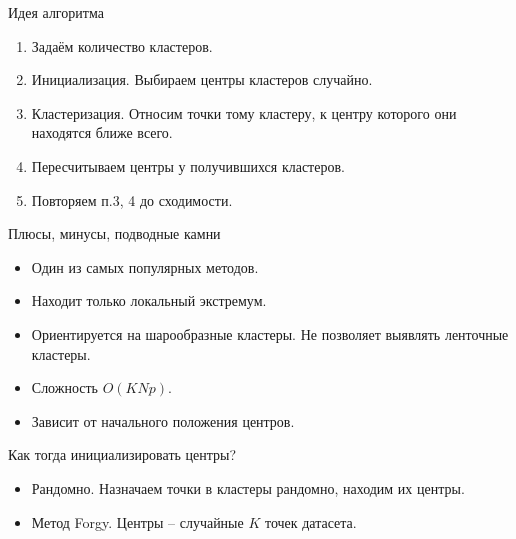 \documentclass[9pt]{beamer}
\begin{document}
\begin{frame}{Идея алгоритма}
    \begin{enumerate}
        \item Задаём количество кластеров.
        \item Инициализация. Выбираем центры кластеров случайно.
        \item Кластеризация. Относим точки тому кластеру, к центру которого они находятся ближе всего.
        \item Пересчитываем центры у получившихся кластеров.
        \item Повторяем п.3, 4 до сходимости.
    \end{enumerate}
\end{frame}


\begin{frame}{Плюсы, минусы, подводные камни}
\begin{itemize}
    \item  Один из самых популярных методов.
    \item Находит только локальный экстремум.
    \item Ориентируется на шарообразные кластеры. Не позволяет выявлять ленточные кластеры.
    \item Сложность $O(KNp)$.
    \item Зависит от начального положения центров.
\end{itemize}
\end{frame}


\begin{frame}{Как тогда инициализировать центры?}
\begin{itemize}
    \item Рандомно. Назначаем точки в кластеры рандомно, находим их центры.
    \item Метод Forgy. Центры -- случайные $K$ точек датасета.
\end{itemize}
\end{frame}
\end{document}
